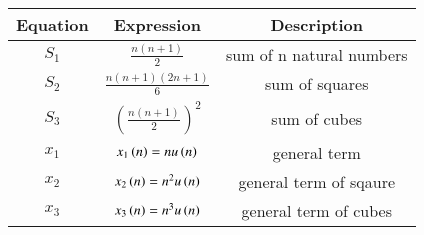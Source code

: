\begin{tabular}{|c|c|c|}
    \hline
    \textbf{Equation} & \textbf{Expression} & \textbf{Description} \\
    \hline
    \(S_1\) & \(\frac{n(n+1)}{2}\) & sum of n natural numbers\\
    \hline
    \(S_2\) & \(\frac{n(n+1)(2n+1)}{6}\) & sum of squares\\
    \hline
    \(S_3\) & \(\left(\frac{n(n+1)}{2}\right)^2\) & sum of cubes \\
    \hline
    \(x_1\) & \(x_1\left( n \right) = n u\left( n \right)\) & general term  \\
    \hline
    \(x_2\) & \(x_2\left( n \right) = n^2 u\left( n \right)\) & general term of sqaure \\
    \hline
    \(x_3\) & \(x_3\left( n \right) = n^3 u\left( n \right)\) & general term of cubes \\
    \hline
\end{tabular}
